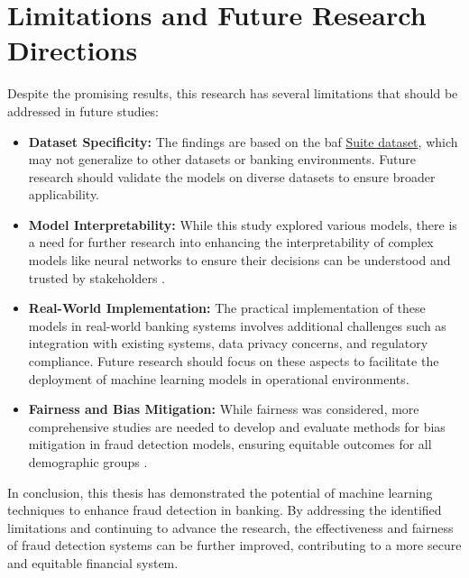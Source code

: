 \documentclass[12pt,a4paper]{report}
\begin{document}
\section{Limitations and Future Research Directions}
Despite the promising results, this research has several limitations that should be addressed in future studies:

\begin{itemize}
    \item \textbf{Dataset Specificity:} The findings are based on the \acrshort{baf} \href{https://www.kaggle.com/datasets/sgpjesus/bank-account-fraud-dataset-neurips-2022/code}{Suite dataset}, which may not generalize to other datasets or banking environments. Future research should validate the models on diverse datasets to ensure broader applicability.
    \item \textbf{Model Interpretability:} While this study explored various models, there is a need for further research into enhancing the interpretability of complex models like neural networks to ensure their decisions can be understood and trusted by stakeholders \citep{barocas2023fairness}.
    \item \textbf{Real-World Implementation:} The practical implementation of these models in real-world banking systems involves additional challenges such as integration with existing systems, data privacy concerns, and regulatory compliance. Future research should focus on these aspects to facilitate the deployment of machine learning models in operational environments.
    \item \textbf{Fairness and Bias Mitigation:} While fairness was considered, more comprehensive studies are needed to develop and evaluate methods for bias mitigation in fraud detection models, ensuring equitable outcomes for all demographic groups \citep{corbett2023measure}.
\end{itemize}

In conclusion, this thesis has demonstrated the potential of machine learning techniques to enhance fraud detection in banking. By addressing the identified limitations and continuing to advance the research, the effectiveness and fairness of fraud detection systems can be further improved, contributing to a more secure and equitable financial system.




\end{document}
